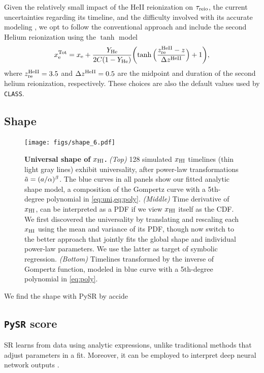 Given the relatively small impact of the HeII reionization on
$\tau_{\mathrm{reio}}$, the current uncertainties regarding its timeline, and the
difficulty involved with its accurate modeling \cite{Hotinli2023,
Upton2020}, we opt to follow the conventional approach and include the
second Helium reionization using the $\tanh$ model
%
\begin{equation}
\label{eq:xe_tot}
x_{\mathrm{e}}^\mathrm{Tot} = x_{\mathrm{e}} + \frac{Y_{\mathrm{He}}}{2C(1 - Y_{\mathrm{He}})}
  \biggl(\tanh{\Bigl(\frac{z_{\mathrm{re}}^{\mathrm{HeII}}- z}{\Delta z^{\mathrm{HeII}}}\Bigr)} + 1\biggr),
\end{equation}
%
where $z_{\mathrm{re}}^{\mathrm{HeII}} = 3.5$ and $\Delta z^{\mathrm{HeII}} = 0.5$ are the midpoint
and duration of the second helium reionization, respectively.
These choices are also the default values used by \texttt{CLASS}.


\subsection*{Shape}
\label{ssec:shape}

\begin{figure}[tb]
\centering
\texttt{[image: figs/shape\_6.pdf]}
\caption{\textbf{Universal shape of $x_{\mathrm{HI}}$.}
\emph{(Top)} 128 simulated $x_{\mathrm{HI}}$ timelines (thin light gray lines)
exhibit universality, after power-law transformations $\tilde{a} =
(a/\alpha)^\beta$.
The blue curves in all panels show our fitted analytic shape model, a
composition of the Gompertz curve with a 5th-degree polynomial in
\cref{eq:uni,eq:poly}.
\emph{(Middle)} Time derivative of $x_{\mathrm{HI}}$, can be interpreted as a PDF
if we view $x_{\mathrm{HI}}$ itself as the CDF.
We first discovered the universality by translating and rescaling each
$x_{\mathrm{HI}}$ using the mean and variance of its PDF, though now switch to the
better approach that jointly fits the global shape and individual
power-law parameters.
We use the latter as target of symbolic regression.
\emph{(Bottom)} Timelines transformed by the inverse of Gompertz
function, modeled in blue curve with a 5th-degree polynomial in
\cref{eq:poly}.}
\label{fig:shape}
\end{figure}

We find the shape with PySR by accide


\subsection*{\texttt{PySR} score}
\label{ssec:pysr}

SR learns from data using analytic expressions, unlike traditional
methods that adjust parameters in a fit.
Moreover, it can be employed to interpret deep neural network outputs
\cite{Cranmer2020b}.

